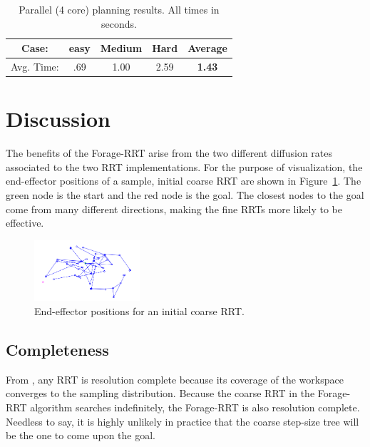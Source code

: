 \documentclass[conference]{IEEEtran}
\begin{document}
\begin{table}
  \centering
  \caption{Parallel (4 core) planning results. All times in seconds.
    \label{tab:BestParallel}}
  \begin{tabular}{|c|c|c|c|c|}
    \hline
    Case: & easy & Medium & Hard & Average \\
	\hline
	Avg. Time: & .69 & 1.00 & 2.59 & \textbf{1.43} \\  \hline
  \end{tabular}
\end{table}

\section{Discussion}
The benefits of the Forage-RRT arise from the two different diffusion rates
associated to the two RRT implementations.  For the purpose of visualization, 
the end-effector positions of a sample, initial coarse RRT are shown in 
Figure~\ref{fig:CoarseRRT}.  
The green node is the start and the red node is the goal.
The closest nodes to the goal come from many different directions, making
the fine RRTs more likely to be effective.

\begin{figure}[h!]
  \centering
  \includegraphics[width=0.35\textwidth]{figures/coarseRRTExample.png}
  \caption{End-effector positions for an initial coarse RRT. 
    \label{fig:CoarseRRT} }
\end{figure}

\label{sec:disc}
\subsection{Completeness}
From \cite{lavalle98}, any RRT is resolution complete because its
coverage of the workspace converges to the sampling distribution.  Because
the coarse RRT in the Forage-RRT algorithm searches indefinitely, the 
Forage-RRT is also resolution complete. Needless to say, it is highly
unlikely in practice that the coarse step-size tree will be the one to come
upon the goal.
\end{document}
